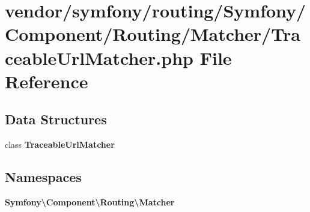 \section{vendor/symfony/routing/\+Symfony/\+Component/\+Routing/\+Matcher/\+Traceable\+Url\+Matcher.php File Reference}
\label{_traceable_url_matcher_8php}
\subsection*{Data Structures}
\begin{DoxyCompactItemize}
\item 
class {\bf Traceable\+Url\+Matcher}
\end{DoxyCompactItemize}
\subsection*{Namespaces}
\begin{DoxyCompactItemize}
\item 
 {\bf Symfony\textbackslash{}\+Component\textbackslash{}\+Routing\textbackslash{}\+Matcher}
\end{DoxyCompactItemize}
